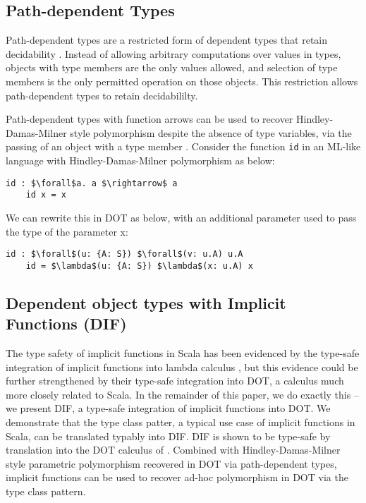 \subsection{Path-dependent Types}
Path-dependent types are a restricted form of dependent types that retain
decidability \cite{AGORS16}. Instead of allowing arbitrary computations over
values in types, objects with type members are the only values allowed, and
selection of type members is the only permitted operation on those objects.
This restriction allows path-dependent types to retain decidabililty.

Path-dependent types with function arrows can be used to recover
Hindley-Damas-Milner style polymorphism despite the absence of type variables,
via the passing of an object with a type member \cite{AGORS16}. Consider the
function \texttt{id} in an ML-like language with Hindley-Damas-Milner
polymorphism as below:

\begin{minipage}{\linewidth}
\begin{lstlisting}[mathescape]
    id : $\forall$a. a $\rightarrow$ a
    id x = x
\end{lstlisting}
\end{minipage}

We can rewrite this in DOT as below, with an additional parameter used to pass the type of the parameter x:

\begin{minipage}{\linewidth}
\begin{lstlisting}[mathescape]
    id : $\forall$(u: {A: S}) $\forall$(v: u.A) u.A
    id = $\lambda$(u: {A: S}) $\lambda$(x: u.A) x
\end{lstlisting}
\end{minipage}

\subsection{Dependent object types with Implicit Functions (DIF)}

The type safety of implicit functions in Scala has been evidenced by the
type-safe integration of implicit functions into lambda calculus \cite{OBLB18},
but this evidence could be further strengthened by their type-safe integration
into DOT, a calculus much more closely related to Scala. In the remainder of
this paper, we do exactly this -- we present DIF, a type-safe integration of
implicit functions into DOT. We demonstrate that the type class patter, a
typical use case of implicit functions in Scala, can be translated typably into
DIF. DIF is shown to be type-safe by translation into the DOT calculus of
\cite{AGORS16}. Combined with Hindley-Damas-Milner style parametric polymorphism recovered in DOT via path-dependent types, implicit functions can be used to recover ad-hoc polymorphism in DOT via the type class pattern.

